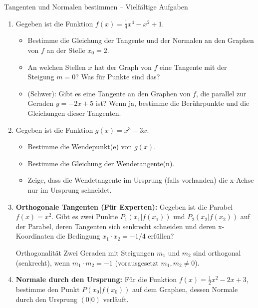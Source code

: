 \begin{aufgabenumgebung}{Tangenten und Normalen bestimmen – Vielfältige Aufgaben}
\begin{enumerate}
    \item Gegeben ist die Funktion $f(x) = \frac{1}{4}x^4 - x^2 + 1$.
        \begin{itemize}
            \item Bestimme die Gleichung der Tangente und der Normalen an den Graphen von $f$ an der Stelle $x_0 = 2$.
            \item An welchen Stellen $x$ hat der Graph von $f$ eine Tangente mit der Steigung $m=0$? Was für Punkte sind das?
            \item (Schwer): Gibt es eine Tangente an den Graphen von $f$, die parallel zur Geraden $y = -2x+5$ ist? Wenn ja, bestimme die Berührpunkte und die Gleichungen dieser Tangenten.
        \end{itemize}
    \item Gegeben ist die Funktion $g(x) = x^3 - 3x$.
        \begin{itemize}
            \item Bestimme die Wendepunkt(e) von $g(x)$.
            \item Bestimme die Gleichung der Wendetangente(n).
            \item Zeige, dass die Wendetangente im Ursprung (falls vorhanden) die x-Achse nur im Ursprung schneidet.
        \end{itemize}
    \item \textbf{Orthogonale Tangenten (Für Experten):}
        Gegeben ist die Parabel $f(x) = x^2$. Gibt es zwei Punkte $P_1(x_1|f(x_1))$ und $P_2(x_2|f(x_2))$ auf der Parabel, deren Tangenten sich senkrecht schneiden und deren x-Koordinaten die Bedingung $x_1 \cdot x_2 = -1/4$ erfüllen?
        \begin{tippumgebung}{Orthogonalität}
        Zwei Geraden mit Steigungen $m_1$ und $m_2$ sind orthogonal (senkrecht), wenn $m_1 \cdot m_2 = -1$ (vorausgesetzt $m_1, m_2 \neq 0$).
        \end{tippumgebung}
    \item \textbf{Normale durch den Ursprung:}
        Für die Funktion $f(x) = \frac{1}{2}x^2 - 2x + 3$, bestimme den Punkt $P(x_0|f(x_0))$ auf dem Graphen, dessen Normale durch den Ursprung $(0|0)$ verläuft.


\end{enumerate}
\end{aufgabenumgebung}
